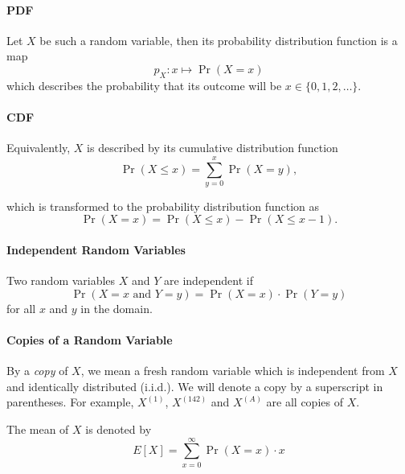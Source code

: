 \documentclass{masterthesis}
\begin{document}
\paragraph*{PDF}\label{paragraph:pdf}
Let $X$ be such a random variable, then its probability distribution function is a map
\begin{equation}
    p_X : x \mapsto \Pr(X = x)
\end{equation} 
which describes the probability that its outcome will be $x \in \{0, 1, 2, \ldots \}$.

\paragraph*{CDF}\label{paragraph:cdf}
Equivalently, $X$ is described by its cumulative distribution function
\begin{equation}
    \Pr(X \leq x) = \sum_{y=0}^{x} \Pr(X = y),
\end{equation}

which is transformed to the probability distribution function as 
\begin{equation}
    \Pr(X = x) = \Pr(X \leq x) - \Pr(X \leq x - 1).
\end{equation}

\paragraph*{Independent Random Variables}\label{paragraph:independent_random_variables}
Two random variables $X$ and $Y$ are independent if 
\begin{equation}
    \Pr(X = x \text{ and } Y = y) = \Pr(X = x) \cdot \Pr(Y = y)
\end{equation}
for all $x$ and $y$ in the domain.

\paragraph*{Copies of a Random Variable}\label{paragraph:copies_of_a_random_variable}
By a \textit{copy} of $X$, we mean a fresh random variable which is independent from $X$ and identically distributed (i.i.d.).
We will denote a copy by a superscript in parentheses. For example, $X^{(1)}$, $X^{(142)}$ and $X^{(A)}$ are all copies of $X$.

The mean of $X$ is denoted by 
\begin{equation}\label{eq:expectation}
    E[X] = \sum_{x=0}^{\infty} \Pr(X = x) \cdot x
\end{equation}
\end{document}
